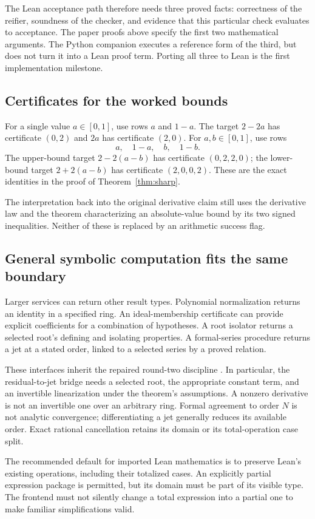 \documentclass[11pt,a4paper]{article}
\theoremstyle{definition}
\theoremstyle{remark}
\begin{document}
The Lean acceptance path therefore needs three proved facts: correctness of the reifier, soundness of the checker, and evidence that this particular check evaluates to acceptance. The paper proofs above specify the first two mathematical arguments. The Python companion executes a reference form of the third, but does not turn it into a Lean proof term. Porting all three to Lean is the first implementation milestone.

\subsection{Certificates for the worked bounds}
For a single value $a\in[0,1]$, use rows $a$ and $1-a$. The target $2-2a$ has certificate $(0,2)$ and $2a$ has certificate $(2,0)$. For $a,b\in[0,1]$, use rows
\[
 a,\quad1-a,\quad b,\quad1-b.
\]
The upper-bound target $2-2(a-b)$ has certificate $(0,2,2,0)$; the lower-bound target $2+2(a-b)$ has certificate $(2,0,0,2)$. These are the exact identities in the proof of Theorem~\ref{thm:sharp}.

The interpretation back into the original derivative claim still uses the derivative law and the theorem characterizing an absolute-value bound by its two signed inequalities. Neither of these is replaced by an arithmetic success flag.

\subsection{General symbolic computation fits the same boundary}
Larger services can return other result types. Polynomial normalization returns an identity in a specified ring. An ideal-membership certificate can provide explicit coefficients for a combination of hypotheses. A root isolator returns a selected root's defining and isolating properties. A formal-series procedure returns a jet at a stated order, linked to a selected series by a proved relation.

These interfaces inherit the repaired round-two discipline \cite{synA,synB}. In particular, the residual-to-jet bridge needs a selected root, the appropriate constant term, and an invertible linearization under the theorem's assumptions. A nonzero derivative is not an invertible one over an arbitrary ring. Formal agreement to order $N$ is not analytic convergence; differentiating a jet generally reduces its available order. Exact rational cancellation retains its domain or its total-operation case split.

The recommended default for imported Lean mathematics is to preserve Lean's existing operations, including their totalized cases. An explicitly partial expression package is permitted, but its domain must be part of its visible type. The frontend must not silently change a total expression into a partial one to make familiar simplifications valid.
\end{document}
